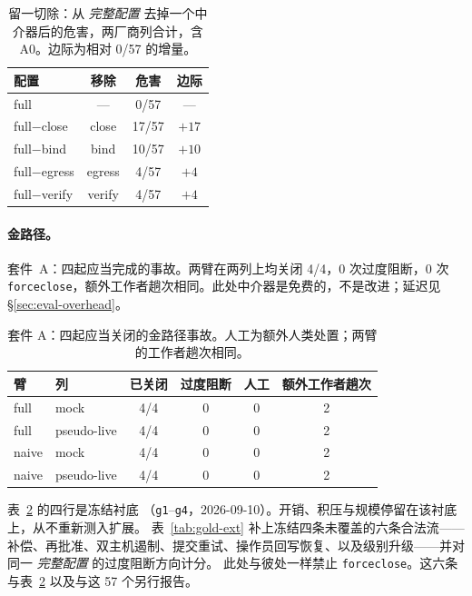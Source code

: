 \documentclass[acmsmall,manuscript,review,anonymous]{acmart}
\renewcommand{\_}{\discretionary{\textunderscore}{}{\textunderscore}}
\begin{document}
\begin{table}
\centering
\small
\caption{留一切除：从 \emph{完整配置} 去掉一个中介器后的危害，两厂商列合计，含 A0。边际为相对 0/57 的增量。}
\label{tab:loo}
\begin{tabular}{@{}lccc@{}}
\hline
配置 & 移除 & 危害 & 边际 \\
\hline
full            & ---    & 0/57  & --- \\
full$-$close    & close  & 17/57 & $+17$ \\
full$-$bind     & bind   & 10/57 & $+10$ \\
full$-$egress   & egress & 4/57  & $+4$ \\
full$-$verify   & verify & 4/57  & $+4$ \\
\hline
\end{tabular}
\end{table}

\paragraph{金路径。}
套件~A：四起应当完成的事故。两臂在两列上均关闭 4/4，0 次过度阻断，0 次 \texttt{force\_close}，额外工作者趟次相同。此处中介器是免费的，不是改进；延迟见
\S\ref{sec:eval-overhead}。

\begin{table}
\centering
\small
\caption{套件 A：四起应当关闭的金路径事故。人工为额外人类处置；两臂的工作者趟次相同。}
\label{tab:gold}
\begin{tabular}{@{}llcccc@{}}
\hline
臂 & 列 & 已关闭 & 过度阻断 & 人工 & 额外工作者趟次 \\
\hline
full  & mock         & 4/4 & 0 & 0 & 2 \\
full  & pseudo-live  & 4/4 & 0 & 0 & 2 \\
naive & mock         & 4/4 & 0 & 0 & 2 \\
naive & pseudo-live  & 4/4 & 0 & 0 & 2 \\
\hline
\end{tabular}
\end{table}

表~\ref{tab:gold} 的四行是冻结衬底
（\texttt{g1}--\texttt{g4}，2026-09-10）。开销、积压与规模停留在该衬底上，从不重新测入扩展。
表~\ref{tab:gold-ext} 补上冻结四条未覆盖的六条合法流——补偿、再批准、双主机遏制、提交重试、操作员回写恢复、以及级别升级——并对同一 \emph{完整配置} 的过度阻断方向计分。
此处与彼处一样禁止 \texttt{force\_close}。这六条与表~\ref{tab:gold} 以及与这 57 个另行报告。
\end{document}
